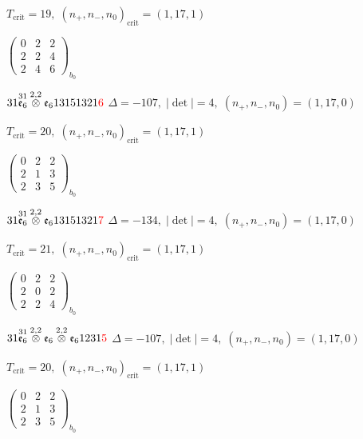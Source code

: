 \documentclass[10pt]{article}
\begin{document}
\hspace{1em}$T_{\text{crit}}=19,\; (n_+,n_-,n_0)_{\text{crit}}=(1,17,1)$

\hspace{2em}$\left(\begin{smallmatrix}0 & 2 & 2 \\ 2 & 2 & 4 \\ 2 & 4 & 6\end{smallmatrix}\right)_{\!b_0}$

$31\overset{31}{\mathfrak{e}_6}\overset{2,2}{\otimes}\mathfrak{e}_613151321\textcolor{red}{6}$ \quad $\Delta=-107,\; |\det|=4,\; (n_+,n_-,n_0)=(1,17,0)$

\hspace{1em}$T_{\text{crit}}=20,\; (n_+,n_-,n_0)_{\text{crit}}=(1,17,1)$

\hspace{2em}$\left(\begin{smallmatrix}0 & 2 & 2 \\ 2 & 1 & 3 \\ 2 & 3 & 5\end{smallmatrix}\right)_{\!b_0}$

$31\overset{31}{\mathfrak{e}_6}\overset{2,2}{\otimes}\mathfrak{e}_613151321\textcolor{red}{7}$ \quad $\Delta=-134,\; |\det|=4,\; (n_+,n_-,n_0)=(1,17,0)$

\hspace{1em}$T_{\text{crit}}=21,\; (n_+,n_-,n_0)_{\text{crit}}=(1,17,1)$

\hspace{2em}$\left(\begin{smallmatrix}0 & 2 & 2 \\ 2 & 0 & 2 \\ 2 & 2 & 4\end{smallmatrix}\right)_{\!b_0}$

\smallskip

$31\overset{31}{\mathfrak{e}_6}\overset{2,2}{\otimes}\mathfrak{e}_6\overset{2,2}{\otimes}\mathfrak{e}_61231\textcolor{red}{5}$ \quad $\Delta=-107,\; |\det|=4,\; (n_+,n_-,n_0)=(1,17,0)$

\hspace{1em}$T_{\text{crit}}=20,\; (n_+,n_-,n_0)_{\text{crit}}=(1,17,1)$

\hspace{2em}$\left(\begin{smallmatrix}0 & 2 & 2 \\ 2 & 1 & 3 \\ 2 & 3 & 5\end{smallmatrix}\right)_{\!b_0}$
\end{document}
